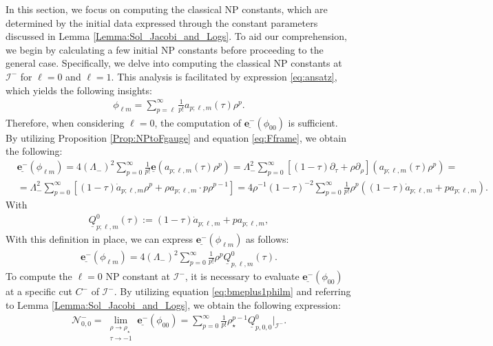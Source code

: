 In this section, we focus on computing the classical NP constants, which are determined by the initial data expressed through the constant parameters discussed in Lemma \ref{Lemma:Sol_Jacobi_and_Logs}. To aid our comprehension, we begin by calculating a few initial NP constants before proceeding to the general case. Specifically, we delve into computing the classical NP constants at $\mathscr{I}^{-}$ for $\ell=0$ and $\ell=1$. This analysis is facilitated by expression \eqref{eq:ansatz}, which yields the following insights:
\begin{align}\label{eq:exp_phi_lm}
  \phi_{\ell m}= \sum_{p=\ell}^{\infty}\frac{1}{p!}a_{p;\ell,m}(\tau)\rho^{p}.
\end{align}
Therefore, when considering $\ell=0$, the computation of $\underline{\boldsymbol{e}^{-}}(\phi_{00})$ is sufficient. By utilizing Proposition \ref{Prop:NPtoFgauge} and equation \eqref{eq:Fframe}, we obtain the following:
\begin{align}\label{eq:ubmeplus1philmraw}
   & \underline{\boldsymbol{e}^{-}}(\phi_{\ell m})= 4(\Lambda_{-})^{2}\sum_{p=0}^{\infty}\frac{1}{p!}\underline{\boldsymbol{e}}(a_{p;\ell,m}(\tau)\rho^{p}) = \Lambda_{-}^{2} \sum_{p=0}^{\infty} \left[(1-\tau) \partial_{\tau}+\rho \partial_{\rho}\right]\left(a_{p ; \ell, m}(\tau) \rho^{p}\right)= \nonumber \\
   & =\Lambda_{-}^{2} \sum_{p=0}^{\infty} \left[(1-\tau) \dot{a}_{p; \ell, m} \rho^{p}+\rho a_{p ; \ell, m} \cdot p \rho^{p-1}\right] = 4 \rho^{-1}(1-\tau)^{-2}\sum_{p=0}^{\infty} \frac{1}{p!}\rho^p((1-\tau)\dot{a}_{p;\ell,m}+p a_{p;\ell,m}).
\end{align}
With
\begin{align}\label{eq:defQu0}
  \underline{Q}^{0}_{p;\ell,m}(\tau):=(1-\tau)\dot{a}_{p;\ell,m}+p a_{p;\ell,m},
\end{align}
With this definition in place, we can express $\underline{\boldsymbol{e}^{-}}(\phi_{\ell m})$ as follows:
\begin{align}\label{eq:bumeplus1philm}
  \underline{\boldsymbol{e}^{-}}(\phi_{\ell m}) = 4 (\Lambda_{-})^{2}\sum_{p=0}^{\infty} \frac{1}{p!}\rho^{p}\underline{Q}^{0}_{p,\ell,m}(\tau).
\end{align}
To compute the $\ell=0$ NP constant at $\mathscr{I}^{-}$, it is necessary to evaluate $\underline{\boldsymbol{e}^{-}}(\phi_{00})$ at a specific cut ${C}^{-}$ of $\mathscr{I}^{-}$. By utilizing equation \eqref{eq:bmeplus1philm} and referring to Lemma \ref{Lemma:Sol_Jacobi_and_Logs}, we obtain the following expression:
\begin{align}
  \mathcal{N}^{-}_{0,0}= \lim_{\substack{\rho \to \rho_{\star} \\ \tau \to -1}}  \underline{\boldsymbol{e}^{-}}(\phi_{00}) = \sum_{p=0}^{\infty} \frac{1}{p!}\rho^{p-1}_{\star}\underline{Q}^{0}_{p,0,0}|_{\mathscr{I}^{-}}.
\end{align}

